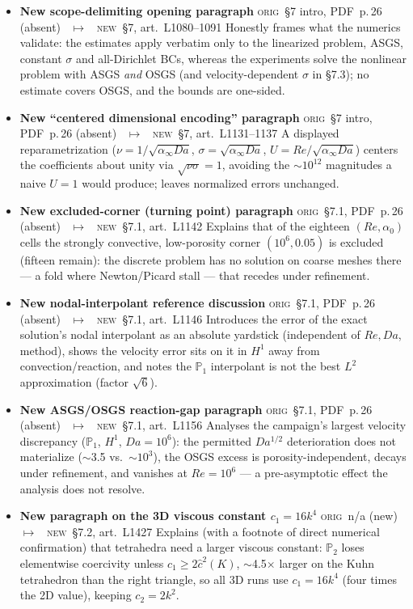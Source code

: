 \documentclass[11pt]{article}
\newcommand{\Orig}{\textcolor{origc}{\footnotesize\textsc{orig}}}
\newcommand{\New}{\textcolor{newc}{\footnotesize\textsc{new}}}
\newcommand{\pdfp}[1]{PDF~p.\,#1}
\newcommand{\artl}[1]{art.\ L#1}       %
\newcommand{\ch}[4]{%
  \item \textbf{#1}\newline
    {\footnotesize\Orig\ #2 \ \textcolor{locc}{$\longmapsto$} \ \New\ #3}\newline
    #4}
\begin{document}
\begin{itemize}
\ch{New scope-delimiting opening paragraph}
   {\S7 intro, \pdfp{26} (absent)}
   {\S7, \artl{1080}--1091}
   {Honestly frames what the numerics validate: the estimates apply verbatim only to the
    linearized problem, ASGS, constant $\sigma$ and all-Dirichlet BCs, whereas the experiments solve
    the nonlinear problem with ASGS \emph{and} OSGS (and velocity-dependent $\sigma$ in \S7.3); no
    estimate covers OSGS, and the bounds are one-sided.}
\ch{New ``centered dimensional encoding'' paragraph}
   {\S7 intro, \pdfp{26} (absent)}
   {\S7, \artl{1131}--1137}
   {A displayed reparametrization ($\nu=1/\sqrt{\alpha_\infty Da}$, $\sigma=\sqrt{\alpha_\infty Da}$,
    $U=Re/\sqrt{\alpha_\infty Da}$) centers the coefficients about unity via $\sqrt{\nu\sigma}=1$,
    avoiding the $\sim\!10^{12}$ magnitudes a naive $U{=}1$ would produce; leaves normalized errors
    unchanged.}
\ch{New excluded-corner (turning point) paragraph}
   {\S7.1, \pdfp{26} (absent)}
   {\S7.1, \artl{1142}}
   {Explains that of the eighteen $(Re,\alpha_0)$ cells the strongly convective, low-porosity corner
    $(10^6,0.05)$ is excluded (fifteen remain): the discrete problem has no solution on coarse meshes
    there --- a fold where Newton/Picard stall --- that recedes under refinement.}
\ch{New nodal-interpolant reference discussion}
   {\S7.1, \pdfp{26} (absent)}
   {\S7.1, \artl{1146}}
   {Introduces the error of the exact solution's nodal interpolant as an absolute yardstick
    (independent of $Re,Da$, method), shows the velocity error sits on it in $H^1$ away from
    convection/reaction, and notes the $\mathbb{P}_1$ interpolant is not the best $L^2$
    approximation (factor $\sqrt6$).}
\ch{New ASGS/OSGS reaction-gap paragraph}
   {\S7.1, \pdfp{26} (absent)}
   {\S7.1, \artl{1156}}
   {Analyses the campaign's largest velocity discrepancy ($\mathbb{P}_1$, $H^1$, $Da{=}10^6$): the
    permitted $Da^{1/2}$ deterioration does not materialize ($\sim$3.5 vs.\ $\sim$$10^3$), the OSGS
    excess is porosity-independent, decays under refinement, and vanishes at $Re{=}10^6$ ---
    a pre-asymptotic effect the analysis does not resolve.}
\ch{New paragraph on the 3D viscous constant $c_1=16k^4$}
   {n/a (new)}
   {\S7.2, \artl{1427}}
   {Explains (with a footnote of direct numerical confirmation) that tetrahedra need a larger
    viscous constant: $\mathbb{P}_2$ loses elementwise coercivity unless $c_1\ge2\hat c^2(K)$,
    $\sim$4.5$\times$ larger on the Kuhn tetrahedron than the right triangle, so all 3D runs use
    $c_1=16k^4$ (four times the 2D value), keeping $c_2=2k^2$.}

\end{itemize}
\end{document}
